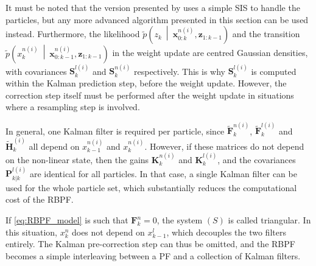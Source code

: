 It must be noted that the version presented by  uses a simple SIS to handle the particles, but any more advanced algorithm presented in this section can be used instead. Furthermore, the likelihood $\tilde{p}\left(z_k\:\middle|\:\mathbf{x}_{0:k}^{n(i)},\mathbf{z}_{1:k-1}\right)$ and the transition $\tilde{p}\left(x_k^{n(i)}\:\middle|\:\mathbf{x}_{0:k-1}^{n(i)},\mathbf{z}_{1:k-1}\right)$ in the weight update are centred Gaussian densities, with covariances $\mathbf{S}_k^{l(i)}$ and $\mathbf{S}_k^{n(i)}$ respectively. This is why $\mathbf{S}_k^{l(i)}$ is computed within the Kalman prediction step, before the weight update. However, the correction step itself must be performed after the weight update in situations where a resampling step is involved.

\begin{remark}
	In general, one Kalman filter is required per particle, since $\tilde{\mathbf{F}}_k^{n(i)}$, $\tilde{\mathbf{F}}_k^{l(i)}$ and $\tilde{\mathbf{H}}_k^{(i)}$ all depend on $x_{k-1}^{n(i)}$ and $x_k^{n(i)}$. However, if these matrices do not depend on the non-linear state, then the gains $\mathbf{K}_k^{n(i)}$ and $\mathbf{K}_k^{l(i)}$, and the covariances $\mathbf{P}_{k|k}^{l(i)}$ are identical for all particles. In that case, a single Kalman filter can be used for the whole particle set, which substantially reduces the computational cost of the RBPF.
\end{remark}

\begin{remark}
	If \eqref{eq:RBPF_model} is such that $\mathbf{F}_k^n=0$, the system $(S)$ is called triangular. In this situation, $x_k^n$ does not depend on $x_{k-1}^l$, which decouples the two filters entirely. The Kalman pre-correction step can thus be omitted, and the RBPF becomes a simple interleaving between a PF and a collection of Kalman filters.
\end{remark}
